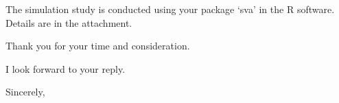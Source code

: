 \documentclass{letter}
\begin{document}
\begin{letter}
The simulation study is conducted using your package `sva' in the R software. Details are in the attachment.


Thank you for your time and consideration.

I look forward to your reply.

\vspace{2\parskip} %
\closing{Sincerely,}
\vspace{2\parskip} %







\end{letter}

 
\end{document}
